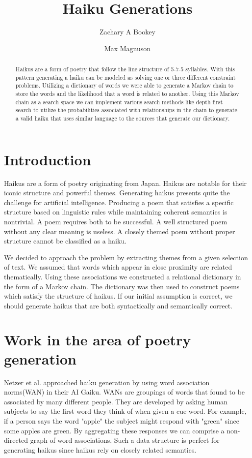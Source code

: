 \documentclass[]{article}
\title{Haiku Generations}
\author{Zachary A Bookey \and Max Magnuson}
\begin{document}
\maketitle

\begin{abstract}
Haikus are a form of poetry that follow the line structure of 5-7-5 syllables. With this pattern generating a haiku can be modeled as solving one or three different constraint problems. Utilizing a dictionary of words we were able to generate a Markov chain to store the words and the likelihood that a word is related to another. Using this Markov chain as a search space we can implement various search methods like depth first search to utilize the probabilities associated with relationships in the chain to generate a valid haiku that uses similar language to the sources that generate our dictionary.
\end{abstract}

\section{Introduction}
Haikus are a form of poetry originating from Japan\cite{Gaiku}. Haikus are notable for their iconic structure and powerful themes. Generating haikus presents quite the challenge for artificial intelligence. Producing a poem that satisfies a specific structure based on linguistic rules while maintaining coherent semantics is nontrivial. A poem requires both to be successful. A well structured poem without any clear meaning is useless. A closely themed poem without proper structure cannot be classified as a haiku.

We decided to approach the problem by extracting themes from a given selection of text. We assumed that words which appear in close proximity are related thematically. Using these associations we constructed a relational dictionary in the form of a Markov chain. The dictionary was then used to construct poems which satisfy the structure of haikus. If our initial assumption is correct, we should generate haikus that are both syntactically and semantically correct.

\section{Work in the area of poetry generation}
Netzer et al. approached haiku generation by using word association norms(WAN) in their AI Gaiku\cite{Gaiku}. WANs are groupings of words that found to be associated by many different people. They are developed by asking human subjects to say the first word they think of when given a cue word. For example, if a person says the word "apple" the subject might respond with "green" since some apples are green. By aggregating these responses we can comprise a non-directed graph of word associations. Such a data structure is perfect for generating haikus since haikus rely on closely related semantics.
\end{document}
